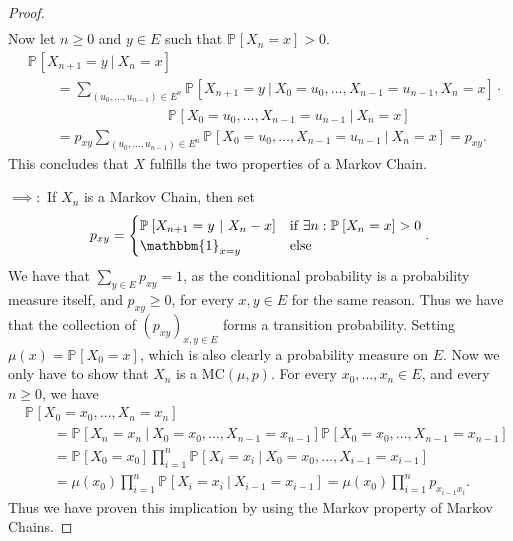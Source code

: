 \begin{proof}
\begin{align}
\end{align}
Now let $n\geq 0$ and $y \in E$ such that $\mathbb{P}_{} \left[ X_n = x \right] > 0$.
\begin{align}
&	\mathbb{P}_{} \left[ X_{n+1} = y \ | \ X_n =x \right] \\
&\qquad = \sum_{(u_0, \ldots ,u_{n-1}) \in E^n}^{} \mathbb{P}_{} \left[ X_{n+1}=y \ | \ X_0=u_0, \ldots ,X_{n-1}=u_{n-1}, X_n =x \right] \cdot \\
& \qquad \qquad \qquad \qquad \qquad  \mathbb{P}_{} \left[ X_0=u_0, \ldots , X_{n-1}=u_{n-1} \ | \ X_n = x \right] \\
&\qquad = p_{xy} \sum_{(u_0, \ldots ,u_{n-1})\in E^n}^{} \mathbb{P}_{} \left[ X_0=u_0, \ldots ,X_{n-1}=u_{n-1} \ | \ X_n = x \right] = p_{xy}
.\end{align}
This concludes that $X$ fulfills the two properties of a Markov Chain.

{\color{blue}
	$\implies:$ If $X_n$ is a Markov Chain, then set
	\begin{align}
		p_{xy} = 
	\begin{cases}
		\mathbb{P}_{} \left[ X_{n+1}=y \ | \ X_n -x \right] & \textrm{if } \exists n: \mathbb{P}_{} \left[ X_n = x \right] >0 \\
		\mathbbm{1}_{x=y} & \textrm{else}
	\end{cases}.
	\end{align}
	We have that $\sum_{y \in E}^{} p_{xy}=1$, as the conditional probability is a probability measure itself, and $p_{xy}\geq 0$, for every $x, y \in E$ for the same reason. Thus we have that the collection of $(p_{xy})_{x,y \in E}$ forms a transition probability. Setting $\mu(x) = \mathbb{P}_{} \left[ X_0 =x \right] $, which is also clearly a probability measure on $E$. Now we only have to show that $X_{n} $ is a $ \textrm{MC}(\mu, p)$. For every $x_0,\ldots , x_n \in E$, and every $n\geq 0$, we have
\begin{align}
& \mathbb{P}_{} \left[ X_0=x_0, \ldots ,X_n=x_n \right] \\ 
	& \qquad = \mathbb{P}_{} \left[ X_n = x_n \ | \ X_0=x_0 , \ldots , X_{n-1}=x_{n-1} \right] \mathbb{P}_{} \left[ X_0=x_0 , \ldots , X_{n-1}=x_{n-1} \right] \\
	& \qquad = \mathbb{P}_{} \left[ X_0 = x_0 \right] \prod_{i=1}^{n} \mathbb{P}_{} \left[ X_i = x_i \ | \ X_0=x_0, \ldots , X_{i-1}=x_{i-1} \right] \\
	& \qquad = \mu(x_0) \prod_{i=1}^n \mathbb{P}_{} \left[ X_i = x_i \ | \ X_{i-1} = x_{i-1}  \right] = \mu(x_0) \prod_{i=1}^n p_{x_{i-1}x_{i}} 
.\end{align}
Thus we have proven this implication by using the Markov property of Markov Chains.

}
\end{proof}
